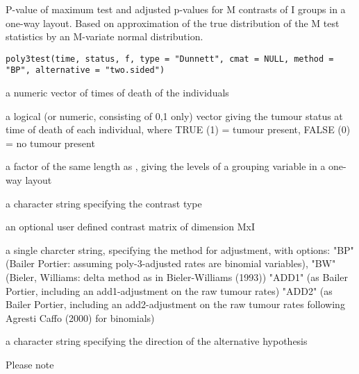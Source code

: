 \begin{Description}\relax
P-value of maximum test and adjusted p-values for M contrasts of I groups in a one-way layout.
Based on approximation of the true distribution of the M test statistics by an M-variate normal distribution.
\end{Description}
\begin{Usage}
\begin{verbatim}
poly3test(time, status, f, type = "Dunnett", cmat = NULL, method = "BP", alternative = "two.sided")
\end{verbatim}
\end{Usage}
\begin{Arguments}
\begin{ldescription}
\item[\code{time}] a numeric vector of times of death of the individuals
\item[\code{status}] a logical (or numeric, consisting of 0,1 only) vector giving the tumour status at time of death of each individual,
where TRUE (1) = tumour present, FALSE (0) = no tumour present  
\item[\code{f}] a factor of the same length as  , giving the levels of a grouping variable in a one-way layout 
\item[\code{type}] a character string specifying the contrast type 
\item[\code{cmat}] an optional user defined contrast matrix of dimension MxI
\item[\code{method}] a single charcter string, specifying the method for adjustment,
with options: "BP" (Bailer Portier: assuming poly-3-adjusted rates are binomial variables),
"BW" (Bieler, Williams: delta method as in Bieler-Williams (1993))
"ADD1" (as Bailer Portier, including an add1-adjustment on the raw tumour rates)
"ADD2" (as Bailer Portier, including an add2-adjustment on the raw tumour rates following Agresti Caffo (2000) for binomials)

\item[\code{alternative}] a character string specifying the direction of the alternative hypothesis
\end{ldescription}
\end{Arguments}
\begin{Details}\relax
Please note
\end{Details}
